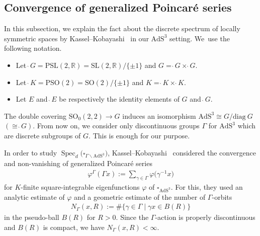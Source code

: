 \documentclass[10pt,a4paper]{amsart}
\numberwithin{equation}{section}
\begin{document}
\subsection{Convergence of generalized Poincar\'e series}\label{preliminary-Poincare}
In this subsection, we explain the fact about the discrete spectrum
of locally symmetric spaces by Kassel--Kobayashi~\cite{KaKob16}
in our $\mathrm{AdS}^{3}$ setting. We~use the following notation.
\begin{Notation}\quad
\begin{itemize}\itemsep=0pt
\item
Let $\grave{\ }G=\mathrm{PSL}(2,\mathbb{R})=
\mathrm{SL}(2,\mathbb{R})/\{\pm1\}$ and
$G=\grave{\ }G\times\grave{\ }G$.
\item
Let $\grave{\ }K=\mathrm{PSO}(2)=\mathrm{SO}(2)/\{\pm1\}$ and
$K = \grave{\ }K\times\grave{\ }K$.
\item
Let $E$ and $\grave{\ }E$ be respectively the identity elements of $G$ and $\grave{\ }G$.
\end{itemize}
\end{Notation}

\begin{Remark}
The double covering $\mathrm{SO}_{0}(2,2)\rightarrow G$ induces
an isomorphism $\mathrm{AdS}^{3}\cong G/\mathrm{diag} \grave{\ }G$ $(\cong \grave{\ }G)$.
From now on, we consider only discontinuous groups $\Gamma$ for $\mathrm{AdS}^{3}$
which are discrete subgroups of $G$.
This is enough for our purpose.
\end{Remark}

In order to study
$\operatorname{Spec}_{d}\big(\square_{\Gamma\backslash\mathrm{AdS}^3}\big)$,
Kassel--Kobayashi~\cite{KaKob16} considered the convergence and non-vanishing of
generalized Poincar\'e series
\begin{gather}
\label{Poincare-series}
\varphi^{\Gamma}(\Gamma x):=\sum_{\gamma \in \Gamma} \varphi\big(\gamma^{-1}x\big)
\end{gather}
for $K$-finite square-integrable eigenfunctions $\varphi$ of $\square_{\mathrm{AdS}^{3}}$.
For this, they used an analytic estimate of $\varphi$ and
a geometric estimate of the number of $\Gamma$-orbits
\begin{gather}
\label{orbit-count}
N_{\Gamma}(x,R) := \#\{\gamma \in \Gamma \mid \gamma x \in B(R)\}
\end{gather}
in the pseudo-ball $B(R)$ for $R>0$.
Since the $\Gamma$-action is properly discontinuous and $B(R)$ is compact,
we have $N_{\Gamma}(x,R)<\infty$.
\end{document}
